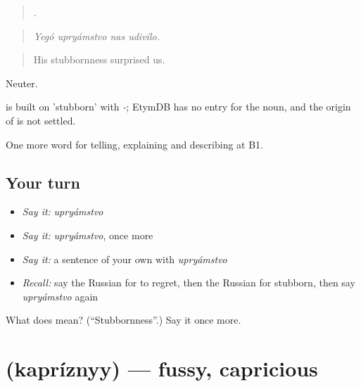 \begin{quote}
   .
\end{quote}

\begin{quote}
\emph{Yegó upryámstvo nas udivílo.}
\end{quote}

\begin{quote}
His stubbornness surprised us.
\end{quote}

Neuter.

\begin{cousinweb}
\emph{} is built on \emph{} 'stubborn' with \emph{-}; EtymDB has no entry for the noun, and the origin of \emph{} is not settled.
\end{cousinweb}

\begin{grammarlens}[title={What you've built}]
One more word for telling, explaining and describing at B1.
\end{grammarlens}

\subsection*{Your turn}
\begin{itemize}
\raggedright
  \item \emph{Say it:} \emph{upryámstvo}
  \item \emph{Say it:} \emph{upryámstvo}, once more
  \item \emph{Say it:} a sentence of your own with \emph{upryámstvo}
  \item \emph{Recall:} say the Russian for to regret, then the Russian for stubborn, then say \emph{upryámstvo} again
\end{itemize}

\begin{tcolorbox}[breakable,colback=teal!4,colframe=teal!35!black,title={Before you move on}]
What does  mean? (\textquotedblleft{}Stubbornness\textquotedblright{}.) Say it once more.
\end{tcolorbox}
\section[\texorpdfstring{\ru{капризный} (kapríznyy)}{капризный (kapríznyy)}]{ (kapríznyy) — fussy, capricious}

\label{lesson:RU-C478-kapriznyy}



